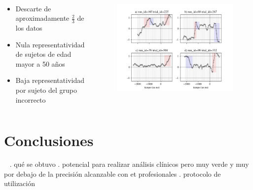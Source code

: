 \documentclass[aspectratio=169]{beamer}
\begin{document}
\begin{frame}{~}
  \begin{columns}
    \begin{column}{0.4\textwidth}
      \begin{itemize}
        \item Descarte de aproximadamente $\frac{2}{3}$ de los datos
        \item Nula representatividad de sujetos de edad mayor a 50 años
        \item Baja representatividad por sujeto del grupo incorrecto
      \end{itemize}
    \end{column}

    \begin{column}{0.6\textwidth}
      \begin{figure}
        \centering
        \includegraphics[width=0.9\linewidth]{img/undetected-saccades-examples.png}
      \end{figure}
    \end{column}
  \end{columns}
\end{frame}

\section{Conclusiones}

\begin{frame}{~}
. qué se obtuvo
. potencial para realizar análisis clínicos pero muy verde y muy por debajo de
  la precisión alcanzable con et profesionales
. protocolo de utilización
\end{frame}
\end{document}
